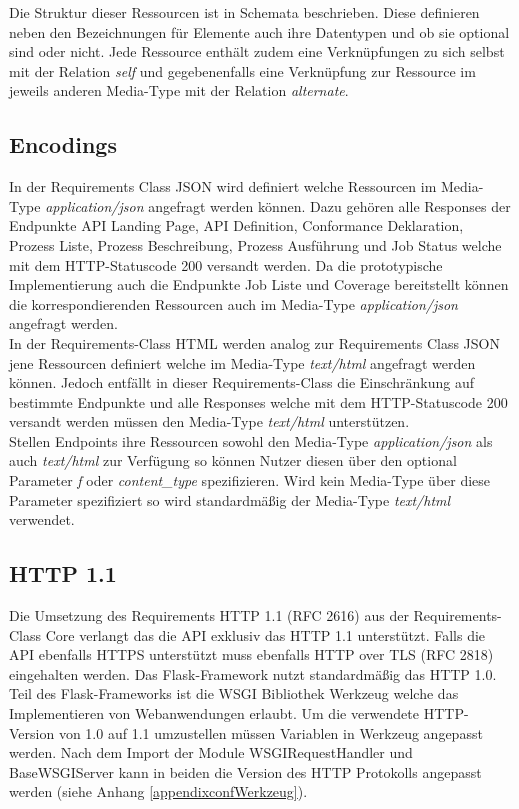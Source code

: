 Die Struktur dieser Ressourcen ist in Schemata beschrieben. Diese definieren neben den Bezeichnungen für Elemente auch ihre Datentypen und 
ob sie optional sind oder nicht. Jede Ressource enthält zudem eine Verknüpfungen zu sich selbst mit der Relation \textit{self} und gegebenenfalls eine Verknüpfung 
zur Ressource im jeweils anderen Media-Type mit der Relation \textit{alternate}. 

\subsection{Encodings}
In der Requirements Class JSON wird definiert welche Ressourcen im Media-Type \textit{application/json} angefragt werden können. Dazu gehören alle Responses der 
Endpunkte API Landing Page, API Definition, Conformance Deklaration, Prozess Liste, Prozess Beschreibung, Prozess Ausführung und Job Status welche mit dem 
HTTP-Statuscode 200 versandt werden. Da die prototypische Implementierung auch die Endpunkte Job Liste und Coverage bereitstellt können die korrespondierenden
Ressourcen auch im Media-Type \textit{application/json} angefragt werden.\\

In der Requirements-Class HTML werden analog zur Requirements Class JSON jene Ressourcen definiert welche im Media-Type \textit{text/html} angefragt werden können. Jedoch
entfällt in dieser Requirements-Class die Einschränkung auf bestimmte Endpunkte und alle Responses welche mit dem HTTP-Statuscode 200 versandt werden müssen den 
Media-Type \textit{text/html} unterstützen.\\
Stellen Endpoints ihre Ressourcen sowohl den Media-Type \textit{application/json} als auch \textit{text/html} zur Verfügung so können Nutzer diesen über den optional Parameter
\textit{f} oder \textit{content\_type} spezifizieren. Wird kein Media-Type über diese Parameter spezifiziert so wird standardmäßig der Media-Type \textit{text/html} verwendet. \\

\subsection{HTTP 1.1}
Die Umsetzung des Requirements HTTP 1.1 (RFC 2616) aus der Requirements-Class Core verlangt das die API exklusiv das HTTP 1.1 unterstützt. 
Falls die API ebenfalls HTTPS unterstützt muss ebenfalls HTTP over TLS (RFC 2818) eingehalten werden. 
Das Flask-Framework nutzt standardmäßig das HTTP 1.0. Teil des Flask-Frameworks ist die WSGI Bibliothek Werkzeug welche
das Implementieren von Webanwendungen erlaubt. Um die verwendete HTTP-Version von 1.0 auf 1.1 umzustellen müssen Variablen 
in Werkzeug angepasst werden. Nach dem Import der Module WSGIRequestHandler und BaseWSGIServer kann in beiden die 
Version des HTTP Protokolls angepasst werden (siehe Anhang \ref{appendixconfWerkzeug}). 

